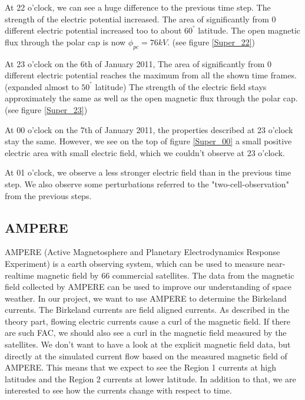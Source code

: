 \documentclass[10pt,a4paper]{article}
\begin{document}
At 22 o'clock, we can see a huge difference to the previous time step. The strength of the electric potential increased. The area of significantly from 0 different electric potential increased too to about $60^{°}$ latitude. The open magnetic flux through the polar cap is now $\phi_{pc}=76 k V$. (see figure \ref{Super_22})

At 23 o'clock on the 6th of January 2011, The area of significantly from 0 different electric potential reaches the maximum from all the shown time frames. (expanded almost to $50^{°}$ latitude) The strength of the electric field stays approximately the same as well as the open magnetic flux through the polar cap. (see figure \ref{Super_23})

At 00 o'clock on the 7th of January 2011, the properties described at 23 o'clock stay the same. However, we see on the top of figure \ref{Super_00} a small positive electric area with small electric field, which we couldn't observe at 23 o'clock.

At 01 o'clock, we observe a 
less stronger electric field than in the previous time step. We also observe some perturbations referred to the "two-cell-observation" from the previous steps. 


\subsection{AMPERE \label{0_CHAPTER_AMPERE}}
AMPERE (Active Magnetosphere and Planetary Electrodynamics Response Experiment) is a earth observing system, which can be used to measure near-realtime magnetic field by 66 commercial satellites.
The data from the magnetic field collected by AMPERE can be used to improve our understanding of space weather.
In our project, we want to use AMPERE to determine the Birkeland currents. The Birkeland currents are field aligned currents. As described in the theory part, flowing electric currents cause a curl of the magnetic field. If there are such FAC, we should also see a curl in the magnetic field measured by the satellites.
We don't want to have a look at the explicit magnetic field data, but directly at the simulated current flow based on the measured magnetic field of AMPERE. This means that we expect to see the Region 1 currents at high latitudes and the Region 2 currents at lower latitude. 
In addition to that, we are interested to see how the currents change with respect to time. 
\end{document}
